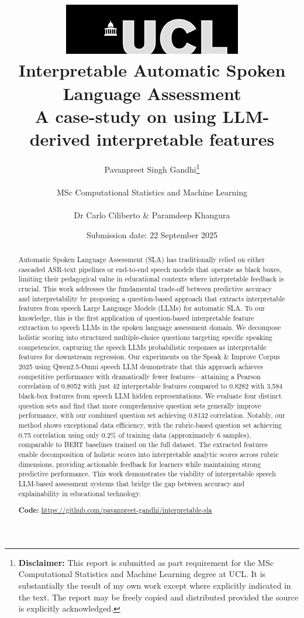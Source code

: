\documentclass{report}
\title{{\includegraphics[scale=.5]{ucl_logo.png}}\\
{{\Huge Interpretable Automatic Spoken Language Assessment}}\\
{\large A case-study on using LLM-derived interpretable features}\\}
\date{Submission date: 22 September 2025}
\author{Pavanpreet Singh Gandhi\thanks{
{\bf Disclaimer:}
This report is submitted as part requirement for the MSc Computational Statistics and Machine Learning degree at UCL. It is
substantially the result of my own work except where explicitly indicated in the text.
The report may be freely copied and distributed provided the source is explicitly acknowledged.}
\\ \\
MSc Computational Statistics and Machine Learning\\ \\
Dr Carlo Ciliberto \& Paramdeep Khangura}
\begin{document}
 
\onehalfspacing
\maketitle
\begin{abstract}
Automatic Spoken Language Assessment (SLA) has traditionally relied on either cascaded ASR-text pipelines or end-to-end speech models that operate as black boxes, limiting their pedagogical value in educational contexts where interpretable feedback is crucial. This work addresses the fundamental trade-off between predictive accuracy and interpretability by proposing a question-based approach that extracts interpretable features from speech Large Language Models (LLMs) for automatic SLA. To our knowledge, this is the first application of question-based interpretable feature extraction to speech LLMs in the spoken language assessment domain. We decompose holistic scoring into structured multiple-choice questions targeting specific speaking competencies, capturing the speech LLMs probabilistic responses as interpretable features for downstream regression. Our experiments on the Speak \& Improve Corpus 2025 using Qwen2.5-Omni speech LLM demonstrate that this approach achieves competitive performance with dramatically fewer features—attaining a Pearson correlation of 0.8052 with just 42 interpretable features compared to 0.8282 with 3,584 black-box features from speech LLM hidden representations. We evaluate four distinct question sets and find that more comprehensive question sets generally improve performance, with our combined question set achieving 0.8132 correlation. Notably, our method shows exceptional data efficiency, with the rubric-based question set achieving 0.75 correlation using only 0.2\% of training data (approximately 6 samples), comparable to BERT baselines trained on the full dataset. The extracted features enable decomposition of holistic scores into interpretable analytic scores across rubric dimensions, providing actionable feedback for learners while maintaining strong predictive performance. This work demonstrates the viability of interpretable speech LLM-based assessment systems that bridge the gap between accuracy and explainability in educational technology.

\textbf{Code:} \href{https://github.com/pavanpreet-gandhi/interpretable-sla}{https://github.com/pavanpreet-gandhi/interpretable-sla}
\end{abstract}
\tableofcontents
\setcounter{page}{1}
\end{document}
